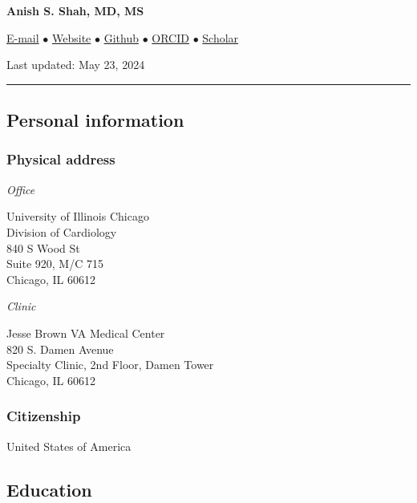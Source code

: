\documentclass[
  16,
]{article}
\author{}
\date{}
\begin{document}
\begin{huge}\begin{center}{\bf Anish S. Shah, MD, MS}\end{center}\end{huge}

\begin{center}
\href{mailto:ashah282@uic.edu}{E-mail} $\bullet$
\href{https:/shah-in-boots.github.io}{Website} $\bullet$
\href{https:/github.com/shah-in-boots}{Github} $\bullet$
\href{https://orcid.org/0000-0002-9729-1558}{ORCID} $\bullet$
\href{https://scholar.google.com/citations?hl=en&user=jFGiIJMAAAAJ}{Scholar}
\end{center}

Last updated: May 23, 2024

\begin{center}\rule{0.5\linewidth}{0.5pt}\end{center}

\subsection{Personal information}\label{personal-information}

\subsubsection{Physical address}\label{physical-address}

\emph{Office}

University of Illinois Chicago\\
Division of Cardiology\\
840 S Wood St\\
Suite 920, M/C 715\\
Chicago, IL 60612

\emph{Clinic}

Jesse Brown VA Medical Center\\
820 S. Damen Avenue\\
Specialty Clinic, 2nd Floor, Damen Tower\\
Chicago, IL 60612

\subsubsection{Citizenship}\label{citizenship}

United States of America

\subsection{Education}\label{education}
\end{document}
